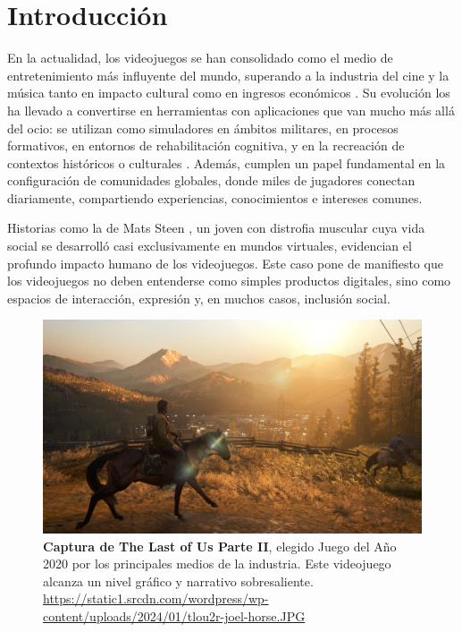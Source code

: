 \chapter{Introducción}

En la actualidad, los videojuegos se han consolidado como el medio de entretenimiento más influyente del mundo, superando a la industria del cine y la música tanto en impacto cultural como en ingresos económicos \cite{arias2023industria}. Su evolución los ha llevado a convertirse en herramientas con aplicaciones que van mucho más allá del ocio: se utilizan como simuladores en ámbitos militares, en procesos formativos, en entornos de rehabilitación cognitiva, y en la recreación de contextos históricos o culturales \cite{williamson2005video}. Además, cumplen un papel fundamental en la configuración de comunidades globales, donde miles de jugadores conectan diariamente, compartiendo experiencias, conocimientos e intereses comunes.

Historias como la de Mats Steen \cite{van2025profound}, un joven con distrofia muscular cuya vida social se desarrolló casi exclusivamente en mundos virtuales, evidencian el profundo impacto humano de los videojuegos. Este caso pone de manifiesto que los videojuegos no deben entenderse como simples productos digitales, sino como espacios de interacción, expresión y, en muchos casos, inclusión social.

\begin{figure}[H]
	\centering
	\includegraphics[width=1\linewidth]{imagenes/tlou2.jpg}
	\caption[\textbf{Captura de The Last of Us Parte II}.]{\textbf{Captura de The Last of Us Parte II}, elegido Juego del Año 2020 por los principales medios de la industria. Este videojuego alcanza un nivel gráfico y narrativo sobresaliente. \href{https://static1.srcdn.com/wordpress/wp-content/uploads/2024/01/tlou2r-joel-horse.JPG}{https://static1.srcdn.com/wordpress/wp-content/uploads/2024/01/tlou2r-joel-horse.JPG}}
	\label{foto-the-last-of-us-2}
\end{figure}

